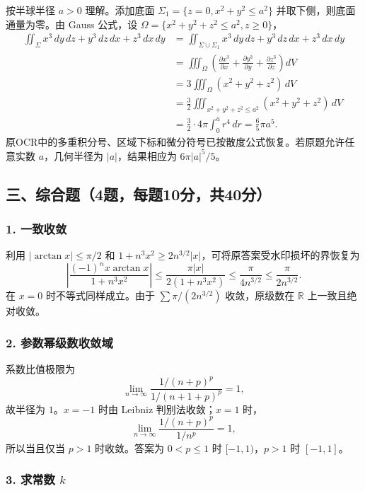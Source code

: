 \documentclass[11pt,fontset=fandol]{ctexart}
\begin{document}
按半球半径 \(a>0\) 理解。添加底面 \(\Sigma_1=\{z=0,x^2+y^2\le a^2\}\)
并取下侧，则底面通量为零。由 Gauss 公式，设
\(\Omega=\{x^2+y^2+z^2\le a^2,z\ge0\}\)， \[
\begin{aligned}
\iint_\Sigma x^3\,dy\,dz+y^3\,dz\,dx+z^3\,dx\,dy
&=\iint_{\Sigma\cup\Sigma_1}x^3\,dy\,dz+y^3\,dz\,dx+z^3\,dx\,dy\\
&=\iiint_\Omega\left(\frac{\partial x^3}{\partial x}+\frac{\partial y^3}{\partial y}+\frac{\partial z^3}{\partial z}\right)dV\\
&=3\iiint_\Omega(x^2+y^2+z^2)\,dV\\
&=\frac32\iiint_{x^2+y^2+z^2\le a^2}(x^2+y^2+z^2)\,dV\\
&=\frac32\cdot4\pi\int_0^ar^4\,dr=\frac65\pi a^5.
\end{aligned}
\]
原OCR中的多重积分号、区域下标和微分符号已按散度公式恢复。若原题允许任意实数
\(a\)，几何半径为 \(|a|\)，结果相应为 \(6\pi|a|^5/5\)。

\subsection{三、综合题（4题，每题10分，共40分）}\label{ux4e09ux7efcux5408ux98984ux9898ux6bcfux989810ux5206ux517140ux5206}

\subsubsection{1. 一致收敛}\label{ux4e00ux81f4ux6536ux655b}

利用 \(|\arctan x|\le\pi/2\) 和
\(1+n^3x^2\ge2n^{3/2}|x|\)，可将原答案受水印损坏的界恢复为 \[
\left|\frac{(-1)^nx\arctan x}{1+n^3x^2}\right|
\le\frac{\pi|x|}{2(1+n^3x^2)}\le\frac\pi{4n^{3/2}}\le\frac\pi{2n^{3/2}}.
\] 在 \(x=0\) 时不等式同样成立。由于 \(\sum\pi/(2n^{3/2})\)
收敛，原级数在 \(\mathbb R\) 上一致且绝对收敛。

\subsubsection{2.
参数幂级数收敛域}\label{ux53c2ux6570ux5e42ux7ea7ux6570ux6536ux655bux57df}

系数比值极限为 \[
\lim_{n\to\infty}\frac{1/(n+p)^p}{1/(n+1+p)^p}=1,
\] 故半径为 \(1\)。\(x=-1\) 时由 Leibniz 判别法收敛；\(x=1\) 时， \[
\lim_{n\to\infty}\frac{1/(n+p)^p}{1/n^p}=1,
\] 所以当且仅当 \(p>1\) 时收敛。答案为 \(0<p\le1\) 时
\([-1,1)\)，\(p>1\) 时 \([-1,1]\)。

\subsubsection{\texorpdfstring{3. 求常数
\(k\)}{3. 求常数 k}}\label{ux6c42ux5e38ux6570-k}
\end{document}
